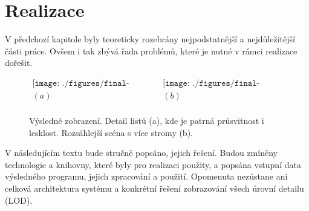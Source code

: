 \chapter{Realizace}
\label{chap:realizace}

V předchozí kapitole byly teoreticky rozebrány nejpodstatnější a nejdůležitější části práce. Ovšem i tak zbývá řada problémů, které je nutné v rámci realizace dořešit. 

\begin{figure}[here]
\begin{center}
$\begin{array}{cc}
\texttt{[image: ./figures/final-leaves\_H.png]}&
\texttt{[image: ./figures/final-trees\_H.png]}\\
(a)&(b)\\
\end{array}$
\caption[Ukázka výsledného zobrazení]%
{Výsledné zobrazení. Detail listů (a), kde je patrná průsvitnost i lesklost. Rozsáhlejší scéna s více stromy (b).\label{fig:resultA}
}
\end{center}
\end{figure}
V následujícím textu bude stručně popsáno, jejich řešení. Budou zmíněny technologie a knihovny, které byly pro realizaci použity, a popsána vstupní data výsledného programu, jejich zpracování a použití. Opomenuta nezůstane ani celková architektura systému a konkrétní řešení zobrazování všech úrovní detailu (LOD).

\pagebreak













